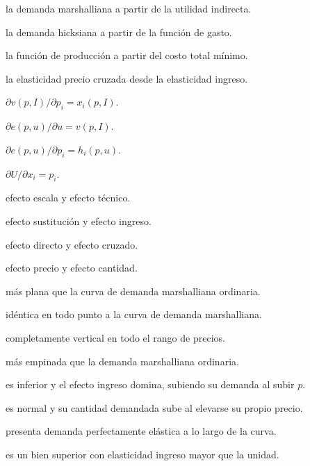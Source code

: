 \begin{opts}
    \item la demanda marshalliana a partir de la utilidad indirecta.
    \item la demanda hicksiana a partir de la función de gasto.
    \item la función de producción a partir del costo total mínimo.
    \item la elasticidad precio cruzada desde la elasticidad ingreso.
\end{opts}

\begin{opts}
    \item $\partial v(p,I)/\partial p_i=x_i(p,I)$.
    \item $\partial e(p,u)/\partial u=v(p,I)$.
    \item $\partial e(p,u)/\partial p_i=h_i(p,u)$.
    \item $\partial U/\partial x_i=p_i$.
\end{opts}

\begin{opts}
    \item efecto escala y efecto técnico.
    \item efecto sustitución y efecto ingreso.
    \item efecto directo y efecto cruzado.
    \item efecto precio y efecto cantidad.
\end{opts}

\begin{opts}
    \item más plana que la curva de demanda marshalliana ordinaria.
    \item idéntica en todo punto a la curva de demanda marshalliana.
    \item completamente vertical en todo el rango de precios.
    \item más empinada que la demanda marshalliana ordinaria.
\end{opts}

\begin{opts}
    \item es inferior y el efecto ingreso domina, subiendo su demanda al subir $p$.
    \item es normal y su cantidad demandada sube al elevarse su propio precio.
    \item presenta demanda perfectamente elástica a lo largo de la curva.
    \item es un bien superior con elasticidad ingreso mayor que la unidad.
\end{opts}

